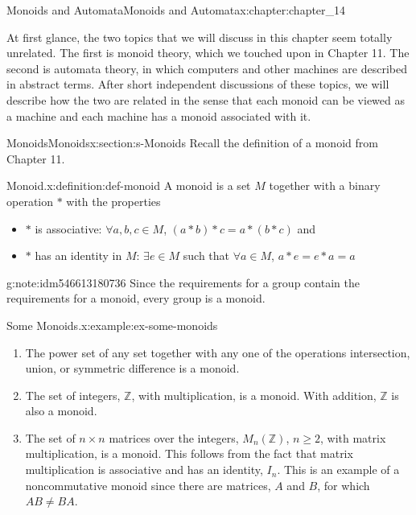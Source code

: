 \documentclass[oneside,10pt,]{book}
\numberwithin{equation}{section}
\begin{document}
\begin{chapterptx}{Monoids and Automata}{}{Monoids and Automata}{}{}{x:chapter:chapter_14}
\begin{introduction}{}%
At first glance, the two topics that we will discuss in this chapter seem totally unrelated. The first is monoid theory, which we touched upon in Chapter 11. The second is automata theory, in which computers and other machines are described in abstract terms. After short independent discussions of these topics, we will describe how the two are related in the sense that each monoid can be viewed as a machine and each machine has a monoid associated with it.%
\end{introduction}%
%
%
\typeout{************************************************}
\typeout{************************************************}
%
\begin{sectionptx}{Monoids}{}{Monoids}{}{}{x:section:s-Monoids}
%
Recall the definition of a monoid from Chapter 11.%
\begin{definition}{Monoid.}{x:definition:def-monoid}%
%
A monoid is a set \(M\) together with a binary operation \(*\) with the properties%
\begin{itemize}[label=\textbullet]
\item{}\(*\) is associative: \(\forall a,b,c \in M\), \((a*b)*c=a*(b*c)\)  and%
\item{}\(*\) has an identity in \(M\):  \(\exists e\in M\) such that \(\forall a \in M\), \(a*e=e*a=a\)%
\end{itemize}
%
\end{definition}
\begin{note}{}{g:note:idm546613180736}%
Since the requirements for a group contain the requirements for a monoid, every group is a monoid.%
\end{note}
\begin{example}{Some Monoids.}{x:example:ex-some-monoids}%
%
\begin{enumerate}[label=(\alph*)]
\item{}The power set of any set together with any one of the operations intersection, union, or symmetric difference is a monoid.%
\item{}The set of integers, \(\mathbb{Z}\), with multiplication, is a monoid. With addition, \(\mathbb{Z}\) is also a monoid.%
\item{}The set of \(n\times n\) matrices over the integers, \(M_n(\mathbb{Z})\), \(n\geq 2\), with matrix multiplication, is a monoid. This follows from the fact that matrix multiplication is associative and has an identity, \(I_n\). This is an example of a noncommutative monoid since there are matrices, \(A\) and \(B\), for which \(A B \neq B A\).%

\end{enumerate}
\end{example}
\end{sectionptx}
\end{chapterptx}
\end{document}
